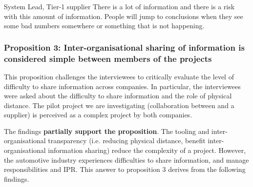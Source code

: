 \begin{aquote}{System Lead, Tier-1 supplier}
There is a lot of information and there is a risk with this amount of information. People will jump to conclusions when they see some bad numbers somewhere or something that is not happening. %
\end{aquote}



%


\subsubsection{Proposition 3: Inter-organisational sharing of information is considered simple between members of the projects}

This proposition challenges the interviewees to critically evaluate the level of difficulty to share information across companies. In particular, the interviewees were asked about the difficulty to share information and the role of physical distance. The pilot project we are investigating (collaboration between \company{} and a supplier) is perceived as a complex project by both companies. %

The findings {\bf partially support the proposition}. The tooling and inter-organisational transparency (i.e. reducing physical distance, benefit inter-organisational information sharing) reduce the complexity of a project. However, the automotive industry experiences difficulties to share information, and manage responsibilities and IPR. This answer to proposition 3 %
derives from the following findings.

